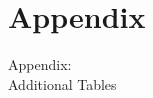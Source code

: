 \documentclass{beamer}
\begin{document}
\section{Appendix}
\appendix

\begin{frame}
\center
\huge
Appendix: \\
Additional Tables
\end{frame}

\begin{frame}
\begin{tiny}
%

\end{tiny}
\end{frame}

%
%
%
\end{document}
